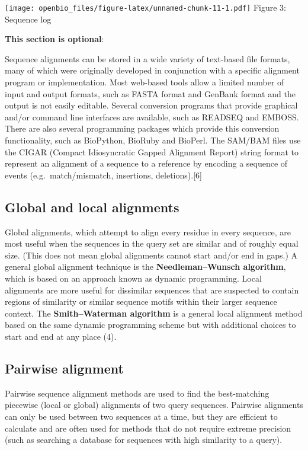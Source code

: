 \documentclass[
]{book}
\begin{document}
\texttt{[image: openbio\_files/figure-latex/unnamed-chunk-11-1.pdf]}
Figure 3: Sequence log

\textbf{This section is optional}:

Sequence alignments can be stored in a wide variety of text-based file formats, many of which were originally developed in conjunction with a specific alignment program or implementation. Most web-based tools allow a limited number of input and output formats, such as FASTA format and GenBank format and the output is not easily editable. Several conversion programs that provide graphical and/or command line interfaces are available, such as READSEQ and EMBOSS. There are also several programming packages which provide this conversion functionality, such as BioPython, BioRuby and BioPerl. The SAM/BAM files use the CIGAR (Compact Idiosyncratic Gapped Alignment Report) string format to represent an alignment of a sequence to a reference by encoding a sequence of events (e.g.~match/mismatch, insertions, deletions).{[}6{]}

\hypertarget{global-and-local-alignments}{%
\subsection{Global and local alignments}\label{global-and-local-alignments}}

Global alignments, which attempt to align every residue in every sequence, are most useful when the sequences in the query set are similar and of roughly equal size. (This does not mean global alignments cannot start and/or end in gaps.) A general global alignment technique is the \textbf{Needleman--Wunsch algorithm}, which is based on an approach known as dynamic programming. Local alignments are more useful for dissimilar sequences that are suspected to contain regions of similarity or similar sequence motifs within their larger sequence context. The \textbf{Smith--Waterman algorithm} is a general local alignment method based on the same dynamic programming scheme but with additional choices to start and end at any place (4).

\hypertarget{pairwise-alignment}{%
\subsection{Pairwise alignment}\label{pairwise-alignment}}

Pairwise sequence alignment methods are used to find the best-matching piecewise (local or global) alignments of two query sequences. Pairwise alignments can only be used between two sequences at a time, but they are efficient to calculate and are often used for methods that do not require extreme precision (such as searching a database for sequences with high similarity to a query).
\end{document}
